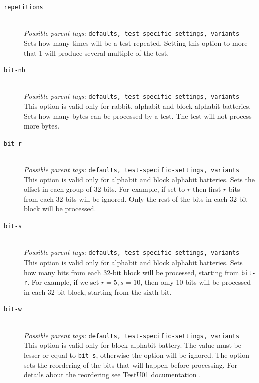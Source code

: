 \documentclass[
	digital,    %
	oneside,    %
	color,
	11pt,
	nocover,
	notable,
	nolof,
	nolot,
]{fithesis3}
\theoremstyle{definition}
\theoremstyle{remark}
\begin{document}
\begin{description}
\item[\texttt{repetitions}] \hfill \\
\textit{Possible parent tags: } \texttt{defaults, test-specific-settings, variants} \\
Sets how many times will be a test repeated. Setting this option to more that 1 will produce several multiple of the test.

\item[\texttt{bit-nb}] \hfill \\
\textit{Possible parent tags: } \texttt{defaults, test-specific-settings, variants} \\
This option is valid only for rabbit, alphabit and block alphabit batteries. Sets how many bytes can be processed by a test. The test will not process more bytes.

\item[\texttt{bit-r}] \hfill \\
\textit{Possible parent tags: } \texttt{defaults, test-specific-settings, variants} \\
This option is valid only for alphabit and block alphabit batteries. Sets the offset in each group of 32 bits. For example, if set to $r$ then first $r$ bits from each 32 bits will be ignored. Only the rest of the bits in each 32-bit block will be processed.

\item[\texttt{bit-s}] \hfill \\
\textit{Possible parent tags: } \texttt{defaults, test-specific-settings, variants} \\
This option is valid only for alphabit and block alphabit batteries. Sets how many bits from each 32-bit block will be processed, starting from \texttt{bit-r}. For example, if we set $r=5, s=10$, then only 10 bits will be processed in each 32-bit block, starting from the sixth bit.

\item[\texttt{bit-w}] \hfill \\
\textit{Possible parent tags: } \texttt{defaults, test-specific-settings, variants} \\
This option is valid only for block alphabit battery. The value must be lesser or equal to \texttt{bit-s}, otherwise the option will be ignored. The option sets the reordering of the bits that will happen before processing. For details about the reordering see TestU01 documentation \cite[p.~155]{testu01-documentation}.


\end{description}
\end{document}

